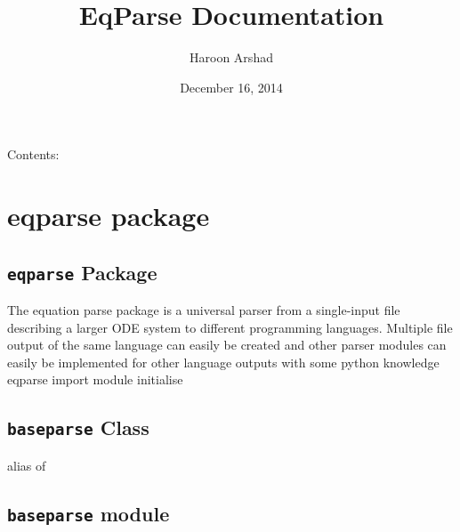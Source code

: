 \documentclass[letterpaper,10pt,english]{sphinxmanual}
\title{EqParse Documentation}
\date{December 16, 2014}
\author{Haroon Arshad}
\begin{document}
\maketitle
\tableofcontents
{}\label{index::doc}


Contents:


\chapter{eqparse package}
\label{eqparse::doc}\label{eqparse:welcome-to-src-s-documentation}\label{eqparse:eqparse-package}

\section{\texttt{eqparse} Package}
\label{eqparse:id1}
The equation parse package is a universal parser from a single-input file describing a larger ODE system to different programming languages. Multiple file output of the same language can easily be created and other parser modules can easily be implemented for other language outputs with some python knowledge
\label{eqparse:module-eqparse.__init__}
eqparse import module initialise


\section{\texttt{baseparse} Class}
\label{eqparse:baseparse-class}

\begin{fulllineitems}
\label{eqparse:eqparse.__init__.baseparse}
alias of {\hyperref[eqparse:module-eqparse.baseparse]{}}

\end{fulllineitems}



\section{\texttt{baseparse} module}
\label{eqparse:module-eqparse.baseparse}\label{eqparse:baseparse-module}
\end{document}

